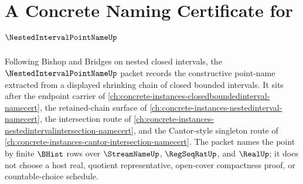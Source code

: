 \chapter{A Concrete Naming Certificate for $\NestedIntervalPointNameUp$}
\label{ch:concrete-instances-nested-interval-point-namecert}

Following Bishop and Bridges on nested closed intervals, the $\NestedIntervalPointNameUp$ packet records the constructive point-name extracted from a displayed shrinking chain of closed bounded intervals. It sits after the endpoint carrier of \autoref{ch:concrete-instances-closedboundedinterval-namecert}, the retained-chain surface of \autoref{ch:concrete-instances-nestedinterval-namecert}, the intersection route of \autoref{ch:concrete-instances-nestedintervalintersection-namecert}, and the Cantor-style singleton route of \autoref{ch:concrete-instances-cantor-intersection-namecert}. The packet names the point by finite $\BHist$ rows over $\StreamNameUp$, $\RegSeqRatUp$, and $\RealUp$; it does not choose a host real, quotient representative, open-cover compactness proof, or countable-choice schedule.

